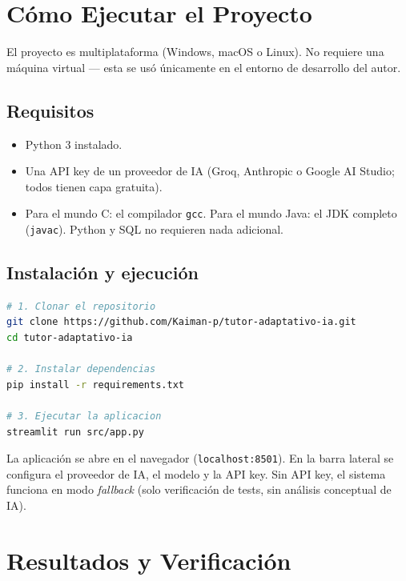 \documentclass[11pt,letterpaper]{article}
\begin{document}
\section{Cómo Ejecutar el Proyecto}

El proyecto es multiplataforma (Windows, macOS o Linux). No requiere
una máquina virtual --- esta se usó únicamente en el entorno de
desarrollo del autor.

\subsection{Requisitos}
\begin{itemize}[leftmargin=*]
  \item Python 3 instalado.
  \item Una API key de un proveedor de IA (Groq, Anthropic o Google AI
  Studio; todos tienen capa gratuita).
  \item Para el mundo C: el compilador \texttt{gcc}. Para el mundo
  Java: el JDK completo (\texttt{javac}). Python y SQL no requieren
  nada adicional.
\end{itemize}

\subsection{Instalación y ejecución}
\begin{lstlisting}[language=bash, caption={Pasos para ejecutar el proyecto}]
# 1. Clonar el repositorio
git clone https://github.com/Kaiman-p/tutor-adaptativo-ia.git
cd tutor-adaptativo-ia

# 2. Instalar dependencias
pip install -r requirements.txt

# 3. Ejecutar la aplicacion
streamlit run src/app.py
\end{lstlisting}

La aplicación se abre en el navegador (\texttt{localhost:8501}). En la
barra lateral se configura el proveedor de IA, el modelo y la API key.
Sin API key, el sistema funciona en modo \textit{fallback} (solo
verificación de tests, sin análisis conceptual de IA).

\section{Resultados y Verificación}
\end{document}
